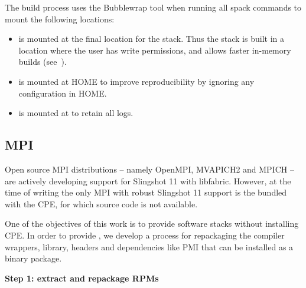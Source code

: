The build process uses the Bubblewrap tool when running all spack commands to mount the following locations:
\begin{itemize}
    \item {} is mounted at the final location for the \spack stack. Thus the stack is built in a location where the user has write permissions, and allows faster in-memory builds (see~).
    \item {} is mounted at HOME to improve reproducibility by ignoring any \spack configuration in HOME.
    \item {} is mounted at  to retain all \spack logs.
\end{itemize}

\subsection{MPI}
Open source MPI distributions -- namely OpenMPI, MVAPICH2 and MPICH -- are actively developing support for Slingshot 11 with libfabric.
However, at the time of writing the only MPI with robust Slingshot 11 support is the \craympich bundled with the CPE, for which source code is not available.

One of the objectives of this work is to provide software stacks without installing CPE.
In order to provide \craympich, we develop a process for repackaging the compiler wrappers, library, headers and dependencies like PMI that can be installed as a \spack binary package.

\noindent\textbf{Step 1: extract and repackage RPMs}



